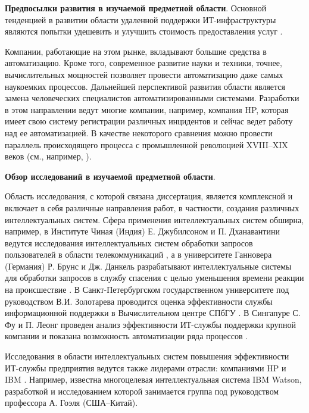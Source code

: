 \textbf{Предпосылки развития в изучаемой предметной области}. 
Основной тенденцией в развитии области удаленной поддержки ИТ-инфраструктуры являются попытки удешевить и улучшить стоимость предоставления услуг \cite{OutsourceEff}. \par
Компании, работающие на этом рынке, вкладывают большие средства в автоматизацию. Кроме того, современное развитие науки и техники, точнее, вычислительных мощностей \cite{SuperComputer} позволяет провести автоматизацию даже самых наукоемких процессов. Дальнейшей перспективой развития области является замена человеческих специалистов автоматизированными системами. Разработки в этом направлении ведут многие компании, например, компания HP, которая имеет свою систему регистрации различных инцидентов \cite{HPOpenView} и сейчас ведет работу над ее автоматизацией. В качестве некоторого сравнения можно провести параллель происходящего процесса с промышленной революцией XVIII–XIX веков (см., например, \cite{IndustrialRev}). \par
\textbf{Обзор исследований в изучаемой предметной области}. 

Область исследования, с которой связана диссертация, является комплексной и включает в себя различные направления работ, в частности, создания различных интеллектуальных систем. Сфера применения интеллектуальных систем обширна, например, в Институте Чиная (Индия) Е. Джубилсоном и П. Дханавантини ведутся исследования интеллектуальных систем обработки запросов пользователей в области телекоммуникаций \cite{CHIN-1}, а в университете Ганновера (Германия) Р. Брунс и Дж. Данкель разрабатывают интеллектуальные системы для обработки запросов в службу спасения с целью уменьшения времени реакции на происшествие \cite{Dunkel}. В Санкт-Петербургском государственном университете под руководством В.И. Золотарева проводится оценка эффективности службы информационной поддержки в Вычислительном центре СПбГУ \cite{SPB}. В Сингапуре С. Фу и П. Леонг проведен анализ эффективности ИТ-службы поддержки крупной компании и показана возможность автоматизации ряда процессов \cite{SING}.\par
Исследования в области интеллектуальных систем повышения эффективности ИТ-службы предприятия ведутся также лидерами отрасли: компаниями HP \cite{HPOpenView} и IBM \cite{WATSON-PO}. Например, известна многоцелевая интеллектуальная система IBM Watson, разработкой и исследованием которой занимается группа под руководством профессора А. Гоэля (США--Китай).  \par   

